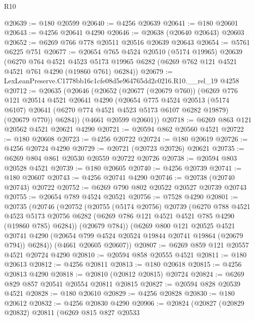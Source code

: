 \begin{lexlean}{R10}
\begin{coremodule}
@20639 := @180 @20599
@20640 := @4256 @20639
@20641 := @180 @20601
@20643 := @4256 @20641 @4290
@20646 := @20638 (@20640 @20643) @20603
@20652 := @6269 @766 @778 @20511 @20516 @20639 @20643
@20654 := @5761 @6225 @751
@20677 := @20654
    @765
    @4524
    @20510
    (@5174 @19965)
    @20639
    (@6270
      @764
      @4521
      @4523
      @5173
      @19965
      @6282
      (@6269 @762 @121 @4521 @4521 @761 @4290 (@19860 @761) @6284))
@20679 := LexLeanPreserve.C1778bb16c1cfe08d5e964765dd2c0216.R10.__rel_19 @4258
@20712 := @20635
    (@20646
      (@20652
        (@20677 (@20679 @760))
        (@6269
          @776
          @121
          @20514
          @4521
          @20641
          @4290
          (@20654
            @775
            @4524
            @20513
            (@5174 @6107)
            @20641
            (@6270 @774 @4521 @4523 @5173 @6107 @6282 @19879)
            (@20679 @770))
          @6284))
      (@4661 @20599 @20601))
@20718 := @6269 @863 @121 @20562 @4521 @20621 @4290
@20721 := @20594 @862 @20560 @4521
@20722 := @180 @20608
@20723 := @4256 @20722
@20724 := @180 @20619
@20726 := @4256 @20724 @4290
@20729 := @20721 (@20723 @20726) @20621
@20735 := @6269 @804 @861 @20530 @20559 @20722 @20726
@20738 := @20594 @803 @20528 @4521
@20739 := @180 @20605
@20740 := @4256 @20739
@20741 := @180 @20607
@20743 := @4256 @20741 @4290
@20746 := @20738 (@20740 @20743) @20722
@20752 := @6269 @790 @802 @20522 @20527 @20739 @20743
@20755 := @20654 @789 @4524 @20521
@20756 := @7528 @4290
@20801 := @20735
    (@20746
      (@20752
        (@20755
          (@5174 @20756)
          @20739
          (@6270
            @788
            @4521
            @4523
            @5173
            @20756
            @6282
            (@6269 @786 @121 @4521 @4521 @785 @4290 (@19860 @785) @6284))
          (@20679 @784))
        (@6269
          @800
          @121
          @20525
          @4521
          @20741
          @4290
          (@20654 @799 @4524 @20524 @19844 @20741 @19864 (@20679 @794))
          @6284))
      (@4661 @20605 @20607))
@20807 := @6269 @859 @121 @20557 @4521 @20724 @4290
@20810 := @20594 @858 @20555 @4521
@20811 := @180 @20613
@20812 := @4256 @20811
@20813 := @180 @20618
@20815 := @4256 @20813 @4290
@20818 := @20810 (@20812 @20815) @20724
@20824 := @6269 @829 @857 @20541 @20554 @20811 @20815
@20827 := @20594 @828 @20539 @4521
@20828 := @180 @20610
@20829 := @4256 @20828
@20830 := @180 @20612
@20832 := @4256 @20830 @4290
@20906 := @20824
    (@20827
      (@20829 @20832)
      @20811
      (@6269
        @815
        @827
        @20533

\end{coremodule}
\end{lexlean}
